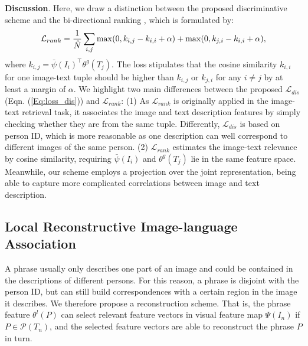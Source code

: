 \documentclass[runningheads]{llncs}
\begin{document}
\noindent \textbf{Discussion}.  Here, we draw a distinction between the proposed discriminative scheme  and the bi-directional ranking \cite{Karpathy:2014,reed2016learning, Dual-path}, which is formulated by:
\begin{equation}\small
 \mathcal{L}_{rank}= \frac{1}{\hat{N}}\sum_{i,j}\max(0, k_{i,j}- k_{i,i}+ \alpha )+ \max(0, k_{j,i}-k_{i,i} + \alpha),  \label{Eq:loss_rank}
\end{equation}
where $k_{i,j} = \bar{\psi}(I_{i})^{\top}\theta^{g}(T_{j})$. The loss stipulates that the cosine similarity  $k_{i,i}$ for one image-text tuple should be higher than $k_{i,j}$ or $k_{j,i}$ for any $i \!\neq\! j$ by at least a margin of $\alpha$.  We highlight two main differences between the proposed $\mathcal{L}_{dis}$(Eqn. (\ref{Eq:loss_dis})) and $\mathcal{L}_{rank}$: (1) As $\mathcal{L}_{rank}$ is originally applied in the image-text retrieval task,  it associates the image and text description features by simply checking whether they are from the same tuple. Differently, $\mathcal{L}_{dis}$ is based on person ID, which is more reasonable as one description can well correspond to different images of the same person. (2) $\mathcal{L}_{rank}$ estimates the image-text relevance by cosine similarity, requiring $\bar{\psi}(I_{i})$ and $\theta^{g}(T_{j})$ lie in the same feature space. Meanwhile, our scheme employs a projection over the joint representation, being able to capture more complicated correlations between image and text description.
 
 

\subsection{Local Reconstructive Image-language Association}\label{Sec:LRA}


A phrase usually only describes one part of an image and could be contained in the descriptions of different persons. For this reason, a phrase is disjoint with the person ID, but can still build correspondences with a certain region in the image it describes. We therefore propose a reconstruction scheme.  That is, the phrase feature $\theta^{l}(P)$ can select relevant feature vectors in visual feature map $\Psi(I_{n})$ if $P \in \mathcal{P}(T_{n})$, and the selected feature vectors are able to reconstruct the phrase $P$ in turn.

\vspace{0.5em}
\end{document}
